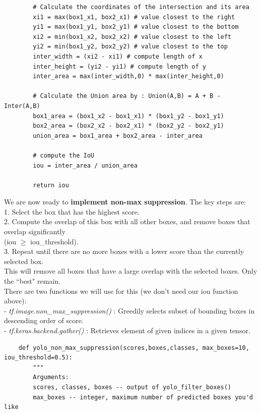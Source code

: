 \documentclass[11pt, a4paper]{article}
\begin{document}
\begin{spacing}{1.1}
\begin{lstlisting}
		# Calculate the coordinates of the intersection and its area
		xi1 = max(box1_x1, box2_x1) # value closest to the right
		yi1 = max(box1_y1, box2_y1) # value closest to the bottom
		xi2 = min(box1_x2, box2_x2) # value closest to the left
		yi2 = min(box1_y2, box2_y2) # value closest to the top
		inter_width = (xi2 - xi1) # compute length of x
		inter_height = (yi2 - yi1) # compute length of y
		inter_area = max(inter_width,0) * max(inter_height,0)
		
		# Calculate the Union area by : Union(A,B) = A + B - Inter(A,B)
		box1_area = (box1_x2 - box1_x1) * (box1_y2 - box1_y1)
		box2_area = (box2_x2 - box2_x1) * (box2_y2 - box2_y1)
		union_area = box1_area + box2_area - inter_area
		
		# compute the IoU
		iou = inter_area / union_area
		
		return iou \end{lstlisting} \vspace*{1mm}
	We are now ready to \textbf{implement non-max suppression}. The key steps are: \\
	1. Select the box that has the highest score. \\
	2. Compute the overlap of this box with all other boxes, and remove boxes that overlap significantly\\ \hspace*{2.5mm}
	(iou $\geq$ iou\_threshold).\\
	3. Repeat until there are no more boxes with a lower score than the currently selected box. \vspace*{1mm}\\
	This will remove all boxes that have a large overlap with the selected boxes. Only the ``best" remain. \vspace*{1.5mm}\\
	There are two functions we will use for this (we don't need our iou function above): \\
	- \textit{tf.image.non\_max\_suppression()} : Greedily selects subset of bounding boxes in descending order of score. \\
	- \textit{tf.keras.backend.gather()} : Retrieves element of given indices in a given tensor. \newpage

	\begin{lstlisting}
	def yolo_non_max_suppression(scores,boxes,classes, max_boxes=10, iou_threshold=0.5):
		"""		
		Arguments:
		scores, classes, boxes -- output of yolo_filter_boxes()
		max_boxes -- integer, maximum number of predicted boxes you'd like
		

\end{lstlisting}
\end{spacing}
\end{document}

